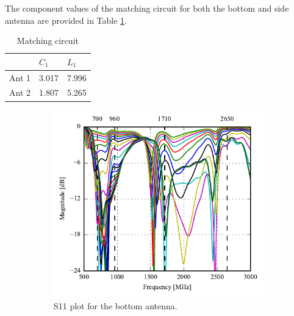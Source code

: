 The component values of the matching circuit for both the bottom and side antenna are provided in Table \ref{tab:ant1_matching}.
\begin{table}[]
\centering
\begin{tabular}{|l|l|l|}
\hline
      & $C_1$    & $L_1$    \\ \hline
Ant 1 & 3.017 & 7.996 \\ \hline
Ant 2 & 1.807 & 5.265 \\ \hline
\end{tabular}
\caption{Matching circuit}
\label{tab:ant1_matching}
\end{table}

\begin{figure}[htbp]
    \begin{subfigure}[b]{0.49\linewidth}
        \centering
        \includegraphics{img/tech_sol/monopole/s11_sweep}
        \caption{S11 plot for the bottom antenna.}
        \label{fig:ant1_s11}
    \end{subfigure}
    \hfill
    \begin{subfigure}[b]{0.49\linewidth}
        \centering

\end{subfigure}
\end{figure}
